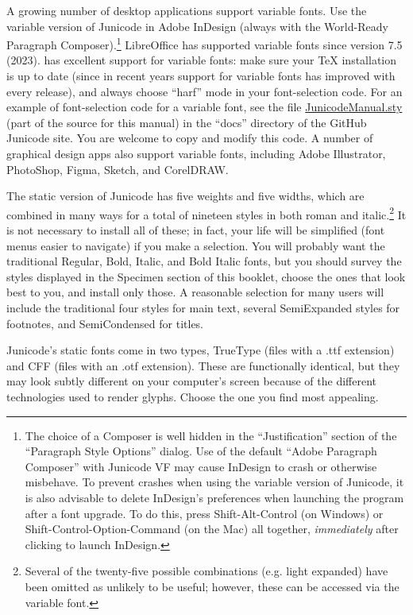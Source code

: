 A growing number of desktop applications support variable fonts. Use the variable version of
Junicode in Adobe InDesign (always with the World-Ready Paragraph Composer).\footnote{%
The choice of a Composer is well hidden in the “Justification” section of the
“Paragraph Style Options” dialog. Use of the default “Adobe Paragraph Composer”
with Junicode VF may cause InDesign to crash or otherwise misbehave. To prevent crashes
when using the variable version of Junicode,
it is also advisable to delete InDesign's preferences when launching the program after
a font upgrade. To do this, press Shift-Alt-Control (on Windows) or
Shift-Control-Option-Command (on the Mac) all together, \textit{immediately} after
clicking to launch InDesign.} LibreOffice
has supported variable fonts since version 7.5 (2023). {\LuaTeX} has excellent support
for variable fonts: make sure your {\TeX} installation is up to date (since in
recent years support for variable fonts has improved with every release), and always choose “harf”
mode in your font-selection code. For an example of font-selection code for a
variable font, see the file
\href{https://github.com/psb1558/Junicode-font/blob/master/docs/JunicodeManual.sty}%
{JunicodeManual.sty} (part of the source for this manual) in the “docs” directory of the GitHub Junicode site.
You are welcome to copy and modify this code. A number of graphical design apps 
also support variable fonts, including Adobe Illustrator, PhotoShop, Figma,
Sketch, and CorelDRAW.

The static version of Junicode has five weights and five widths, which are combined in many ways
for a total of nineteen styles in
both roman and italic.\footnote{Several of the twenty-five possible combinations
(e.g. {\lightexp light expanded})
have been omitted as unlikely to be useful; however, these can be accessed via the variable font.}
It is not necessary to install all of these; in fact,
your life will be simplified (font menus easier to navigate) if you
make a selection. You will probably want the traditional Regular, Bold, Italic, and Bold
Italic fonts, but you should survey the styles displayed in the Specimen
section of this booklet, choose the ones that look best to you, and install
only those. A reasonable selection for many users will include the traditional four
styles for main text, several SemiExpanded styles for footnotes, and
SemiCondensed for titles.

Junicode’s static fonts come in two types, TrueType (files with a .ttf extension) and
CFF (files with an .otf extension). These are functionally identical, but they may look
subtly different on your computer’s screen because of the different technologies used to
render glyphs. Choose the one you find most appealing.

